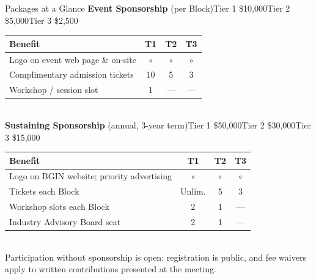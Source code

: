 \documentclass[aspectratio=169,10pt]{beamer}
\begin{document}
\begin{frame}{Packages at a Glance}
  {\small\textbf{Event Sponsorship} (per Block)\hfill Tier 1 \$10,000\quad Tier 2 \$5,000\quad Tier 3 \$2,500}\\[1mm]
  {\small\begin{tabular}{@{}p{8cm}ccc@{}}\toprule
    \textbf{Benefit} & T1 & T2 & T3\\ \midrule
    Logo on event web page \& on-site & $\circ$ & $\circ$ & $\circ$\\
    Complimentary admission tickets & 10 & 5 & 3\\
    Workshop / session slot & 1 & --- & ---\\ \bottomrule
  \end{tabular}}\\[4mm]
  {\small\textbf{Sustaining Sponsorship} (annual, 3-year term)\hfill Tier 1 \$50,000\quad Tier 2 \$30,000\quad Tier 3 \$15,000}\\[1mm]
  {\small\begin{tabular}{@{}p{8cm}ccc@{}}\toprule
    \textbf{Benefit} & T1 & T2 & T3\\ \midrule
    Logo on BGIN website; priority advertising & $\circ$ & $\circ$ & $\circ$\\
    Tickets each Block & Unlim. & 5 & 3\\
    Workshop slots each Block & 2 & 1 & ---\\
    Industry Advisory Board seat & 2 & 1 & ---\\ \bottomrule
  \end{tabular}}\\[2mm]
  {\scriptsize\color{soft} Participation without sponsorship is open: registration is public, and fee waivers apply to written contributions presented at the meeting.}
\end{frame}
\end{document}
